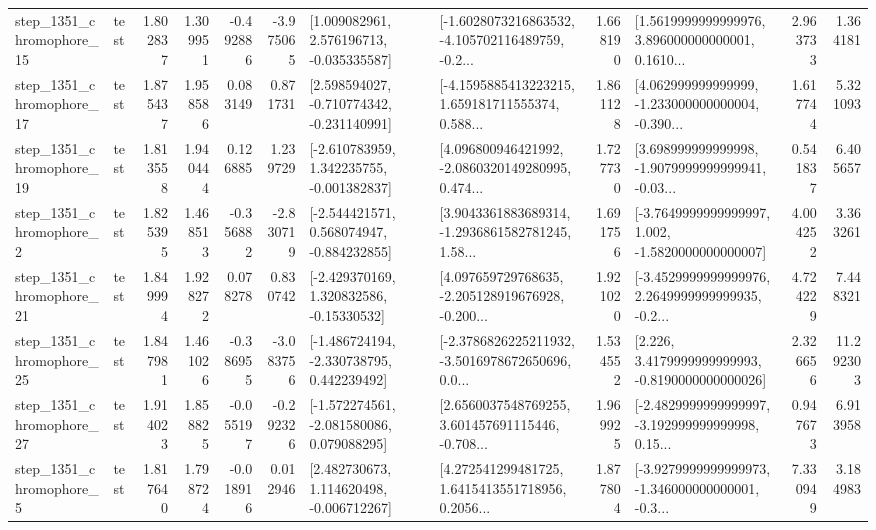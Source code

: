 \begin{tabular}{llrrrrllrlrr}
 step\_1351\_chromophore\_15 &      test &      1.802837 &    1.309951 &     -0.492886 & -3.975065 &    [1.009082961, 2.576196713, -0.035335587] &  [-1.6028073216863532, -4.105702116489759, -0.2... &       1.668190 &  [1.5619999999999976, 3.896000000000001, 0.1610... &            2.963733 &          1.364181 \\
 step\_1351\_chromophore\_17 &      test &      1.875437 &    1.958586 &      0.083149 &  0.871731 &   [2.598594027, -0.710774342, -0.231140991] &  [-4.1595885413223215, 1.659181711555374, 0.588... &       1.861128 &  [4.062999999999999, -1.233000000000004, -0.390... &            1.617744 &          5.321093 \\
 step\_1351\_chromophore\_19 &      test &      1.813558 &    1.940444 &      0.126885 &  1.239729 &   [-2.610783959, 1.342235755, -0.001382837] &  [4.096800946421992, -2.0860320149280995, 0.474... &       1.727730 &  [3.698999999999998, -1.9079999999999941, -0.03... &            0.541837 &          6.405657 \\
  step\_1351\_chromophore\_2 &      test &      1.825395 &    1.468513 &     -0.356882 & -2.830719 &   [-2.544421571, 0.568074947, -0.884232855] &  [3.9043361883689314, -1.2936861582781245, 1.58... &       1.691756 &  [-3.7649999999999997, 1.002, -1.5820000000000007] &            4.004252 &          3.363261 \\
 step\_1351\_chromophore\_21 &      test &      1.849994 &    1.928272 &      0.078278 &  0.830742 &    [-2.429370169, 1.320832586, -0.15330532] &  [4.097659729768635, -2.205128919676928, -0.200... &       1.921020 &  [-3.4529999999999976, 2.2649999999999935, -0.2... &            4.724229 &          7.448321 \\
 step\_1351\_chromophore\_25 &      test &      1.847981 &    1.461026 &     -0.386955 & -3.083756 &   [-1.486724194, -2.330738795, 0.442239492] &  [-2.3786826225211932, -3.5016978672650696, 0.0... &       1.534552 &   [2.226, 3.4179999999999993, -0.8190000000000026] &            2.326656 &         11.292303 \\
 step\_1351\_chromophore\_27 &      test &      1.914023 &    1.858825 &     -0.055197 & -0.292326 &   [-1.572274561, -2.081580086, 0.079088295] &  [2.6560037548769255, 3.601457691115446, -0.708... &       1.969925 &  [-2.4829999999999997, -3.192999999999998, 0.15... &            0.947673 &          6.913958 \\
  step\_1351\_chromophore\_5 &      test &      1.817640 &    1.798724 &     -0.018916 &  0.012946 &    [2.482730673, 1.114620498, -0.006712267] &  [4.272541299481725, 1.6415413551718956, 0.2056... &       1.877804 &  [-3.9279999999999973, -1.346000000000001, -0.3... &            7.330949 &          3.184983 \\

\end{tabular}
